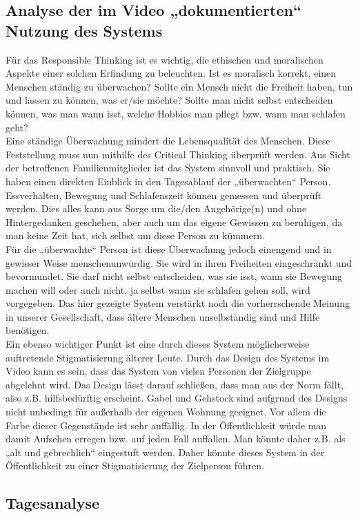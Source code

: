 \subsection{Analyse der im Video „dokumentierten“ Nutzung des Systems}
Für das Responsible Thinking ist es wichtig, die ethischen und moralischen Aspekte einer solchen Erfindung zu beleuchten. 
Ist es moralisch korrekt, einen Menschen ständig zu überwachen? Sollte ein Mensch nicht die Freiheit haben, tun und lassen zu können, was er/sie möchte? Sollte man nicht selbst entscheiden können, was man wann isst, welche Hobbies man pflegt bzw. wann man schlafen geht? \\
Eine ständige Überwachung mindert die Lebensqualität des Menschen. Diese Feststellung muss nun mithilfe des Critical Thinking überprüft werden. Aus Sicht der betroffenen Familienmitglieder ist das System sinnvoll und praktisch. Sie haben einen direkten Einblick in den Tagesablauf der „überwachten“ Person. Essverhalten, Bewegung und Schlafenszeit können gemessen und überprüft werden. Dies alles kann aus Sorge um die/den Angehörige(n) und ohne Hintergedanken geschehen, aber auch um das eigene Gewissen zu beruhigen, da man keine Zeit hat, sich selbst um diese Person zu kümmern. \\
Für die „überwachte“ Person ist diese Überwachung jedoch einengend und in gewisser Weise menschenunwürdig. Sie wird in ihren Freiheiten eingeschränkt und bevormundet. Sie darf nicht selbst entscheiden, was sie isst, wann sie Bewegung machen will oder auch nicht, ja selbst wann sie schlafen gehen soll, wird vorgegeben. Das hier gezeigte System verstärkt noch die vorherrschende Meinung in unserer Gesellschaft, dass ältere Menschen unselbständig sind und Hilfe benötigen. \\
Ein ebenso wichtiger Punkt ist eine durch dieses System möglicherweise auftretende Stigmatisierung älterer Leute. Durch das Design des Systems im Video kann es sein, dass das System von vielen Personen der Zielgruppe abgelehnt wird. Das Design lässt darauf schließen, dass man aus der Norm fällt, also z.B. hilfsbedürftig erscheint. Gabel und Gehstock sind aufgrund des Designs nicht unbedingt für außerhalb der eigenen Wohnung geeignet. Vor allem die Farbe dieser Gegenstände ist sehr auffällig. In der Öffentlichkeit würde man damit Aufsehen erregen bzw. auf jeden Fall auffallen. Man könnte daher z.B. als „alt und gebrechlich“ eingestuft werden. Daher könnte dieses System in der Öffentlichkeit zu einer Stigmatisierung der Zielperson führen.

\subsection{Tagesanalyse}
